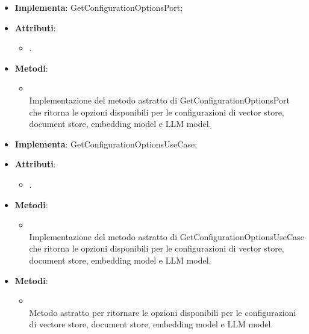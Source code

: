 \documentclass[10pt, a4paper]{article}
\begin{document}
\label{GetConfigurationOptionsPostgresDettaglio}
\begin{itemize}
    \item \textbf{Implementa}: GetConfigurationOptionsPort;
    \item \textbf{Attributi}:
    \begin{itemize}
        \item {}.
    \end{itemize} 
    \item \textbf{Metodi}:
    \begin{itemize}
        \item {}\\
        Implementazione del metodo astratto di GetConfigurationOptionsPort che ritorna le opzioni disponibili per le configurazioni di vector store, document store, embedding model e LLM model.
    \end{itemize}   
\end{itemize}


\label{GetConfigurationOptionsServiceDettaglio}
\begin{itemize}
    \item \textbf{Implementa}: GetConfigurationOptionsUseCase;
    \item \textbf{Attributi}:
    \begin{itemize}
        \item {}.
    \end{itemize} 
    \item \textbf{Metodi}:
    \begin{itemize}
        \item {}\\
        Implementazione del metodo astratto di GetConfigurationOptionsUseCase che ritorna le opzioni disponibili per le configurazioni di vector store, document store, embedding model e LLM model.
    \end{itemize}   
\end{itemize}



\label{GetConfigurationOptionsUseCaseDettaglio}
\begin{itemize}
    \item \textbf{Metodi}:
    \begin{itemize}
        \item {}\\
        Metodo astratto per ritornare le opzioni disponibili per le configurazioni di vectore store, document store, embedding model e LLM model.
    \end{itemize}   
\end{itemize}
\end{document}
